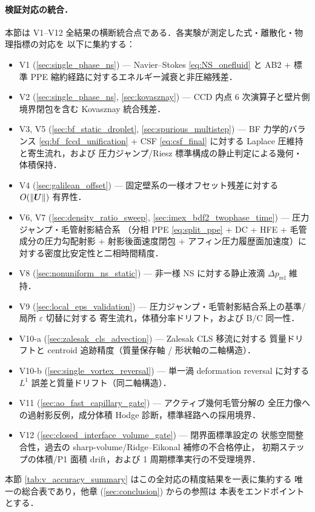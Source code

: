 \paragraph{検証対応の統合．}
本節は V1--V12 全結果の横断統合点である．各実験が測定した式・離散化・物理指標の対応を
以下に集約する：
\begin{itemize}\setlength{\itemsep}{0pt}
  \item V1 (\autoref{sec:single_phase_ns}) — Navier--Stokes \eqref{eq:NS_onefluid}
        と AB2 + 標準 PPE 縮約経路に対するエネルギー減衰と非圧縮残差．
  \item V2 (\autoref{sec:single_phase_ns}, \autoref{sec:kovasznay}) —
        CCD 内点 6 次演算子と壁片側境界閉包を含む Kovasznay 統合残差．
  \item V3, V5 (\autoref{sec:bf_static_droplet}, \autoref{sec:spurious_multistep})
        — BF 力学的バランス \eqref{eq:bf_fccd_unification} + CSF
        \eqref{eq:csf_final} に対する Laplace 圧維持と寄生流れ，および
        圧力ジャンプ/Riesz 標準構成の静止判定による幾何・体積保持．
  \item V4 (\autoref{sec:galilean_offset}) —
        固定壁系の一様オフセット残差に対する $O(\|\bm{U}\|)$ 有界性．
  \item V6, V7 (\autoref{sec:density_ratio_sweep},
        \autoref{sec:imex_bdf2_twophase_time}) — 圧力ジャンプ・毛管射影結合系
        （分相 PPE \eqref{eq:split_ppe} + DC + HFE + 毛管成分の圧力勾配射影 +
        射影後面速度閉包 + アフィン圧力履歴面加速度）に対する密度比安定性と二相時間精度．
  \item V8 (\autoref{sec:nonuniform_ns_static}) — 非一様 NS に対する静止液滴
        $\Delta p_{\mathrm{rel}}$ 維持．
  \item V9 (\autoref{sec:local_eps_validation}) — 圧力ジャンプ・毛管射影結合系上の基準/局所 $\varepsilon$ 切替に対する
        寄生流れ，体積分率ドリフト，および B/C 同一性．
  \item V10-a (\autoref{sec:zalesak_cls_advection}) — Zalesak CLS 移流に対する
        質量ドリフトと centroid 追跡精度（質量保存軸 / 形状軸の二軸構造）．
  \item V10-b (\autoref{sec:single_vortex_reversal}) — 単一渦 deformation
        reversal に対する $L^1$ 誤差と質量ドリフト（同二軸構造）．
  \item V11 (\autoref{sec:ao_fast_capillary_gate}) — アクティブ幾何毛管分解の
        全圧力像への過射影反例，成分体積 Hodge 診断，標準経路への採用境界．
  \item V12 (\autoref{sec:closed_interface_volume_gate}) — 閉界面標準設定の
        状態空間整合性，過去の sharp-volume/Ridge--Eikonal 補修の不合格停止，
        初期ステップの体積/P1 面積 drift，および 1 周期標準実行の不受理境界．
\end{itemize}
本節 \autoref{tab:v_accuracy_summary} はこの全対応の精度結果を一表に集約する
唯一の総合表であり，他章 (\autoref{sec:conclusion}) からの参照は
本表をエンドポイントとする．

\FloatBarrier
